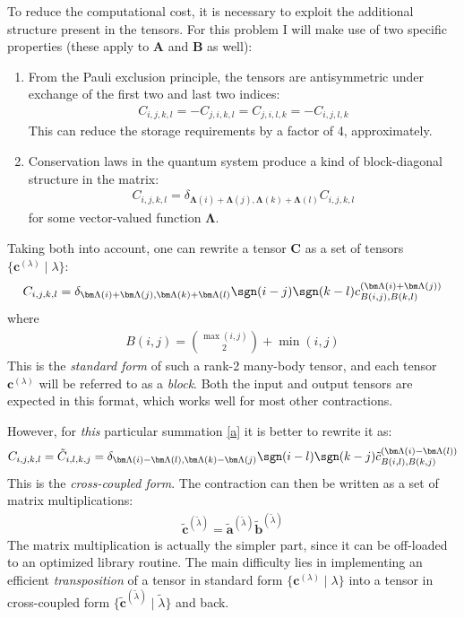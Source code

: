 \documentclass[fleqn, 12pt]{article}
\begin{document}
To reduce the computational cost, it is necessary to exploit the additional structure present in the tensors.  For this problem I will make use of two specific properties (these apply to $\bm A$ and $\bm B$ as well):
\begin{enumerate}
\item From the Pauli exclusion principle, the tensors are antisymmetric under exchange of the first two and last two indices:
  \begin{align*}
    C_{i, j, k, l} = -C_{j, i, k, l} = C_{j, i, l, k} = -C_{i, j, l, k}
  \end{align*}
  This can reduce the storage requirements by a factor of 4, approximately.
\item Conservation laws in the quantum system produce a kind of block-diagonal structure in the matrix:
  \begin{align*}
    C_{i, j, k, l} = \delta_{\bm \Lambda(i) + \bm \Lambda(j), \bm \Lambda(k) + \bm \Lambda(l)} C_{i, j, k, l}
  \end{align*}
  for some vector-valued function $\bm \Lambda$.
\end{enumerate}
Taking both into account, one can rewrite a tensor $\bm C$ as a set of tensors $\{ \bm c^{(\lambda)} \mid \lambda \}$:
\begin{align*}
  C_{i, j, k, l} = \delta_{\bm \Lambda(i) + \bm \Lambda(j), \bm \Lambda(k) + \bm \Lambda(l)}
  \sgn(i - j) \sgn(k - l) c^{(\bm \Lambda(i) + \bm \Lambda(j))}_{B(i, j), B(k, l)}
\end{align*}
where
\begin{align*}
  B(i, j) = \binom{\max(i, j)}{2} + \min(i, j)
\end{align*}
This is the \textit{standard form} of such a rank-2 many-body tensor, and each tensor $\bm c^{(\lambda)}$ will be referred to as a \textit{block}.  Both the input and output tensors are expected in this format, which works well for most other contractions.

However, for \emph{this} particular summation \eqref{a} it is better to rewrite it as:
\begin{align*}
  C_{i, j, k, l} = \tilde C_{i, l, k, j}
  = \delta_{\bm \Lambda(i) - \bm \Lambda(l), \bm \Lambda(k) - \bm \Lambda(j)}
  \sgn(i - l) \sgn(k - j) \tilde c^{(\bm \Lambda(i) - \bm \Lambda(l))}_{B(i, l), B(k, j)}
\end{align*}
This is the \textit{cross-coupled form}.  The contraction can then be written as a set of matrix multiplications:
\begin{align*}
  \tilde{\bm c}^{(\tilde \lambda)} = \tilde{\bm a}^{(\tilde \lambda)} \tilde{\bm b}^{(\tilde \lambda)}
\end{align*}
The matrix multiplication is actually the simpler part, since it can be off-loaded to an optimized library routine.   The main difficulty lies in implementing an efficient \textit{transposition} of a tensor in standard form $\{ \bm c^{(\lambda)} \mid \lambda \}$ into a tensor in cross-coupled form $\{ \tilde{\bm c}^{(\tilde \lambda)} \mid \tilde \lambda \}$ and back.
\end{document}

